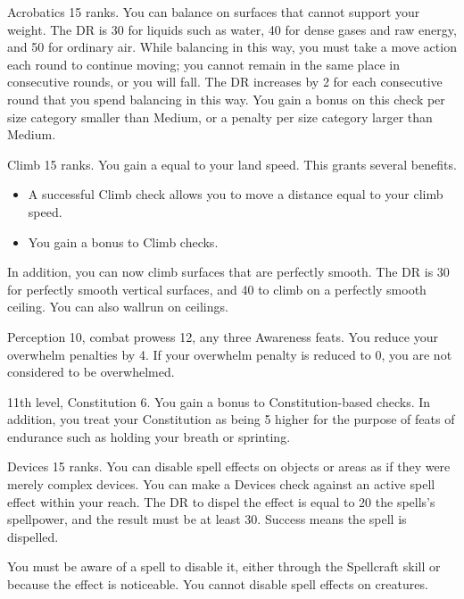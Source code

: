 \featpre Acrobatics 15 ranks.
\featben You can balance on surfaces that cannot support your weight.
The DR is 30 for liquids such as water, 40 for dense gases and raw energy, and 50 for ordinary air.
While balancing in this way, you must take a move action each round to continue moving; you cannot remain in the same place in consecutive rounds, or you will fall.
The DR increases by 2 for each consecutive round that you spend balancing in this way.
You gain a  bonus on this check per size category smaller than Medium, or a  penalty per size category larger than Medium.

\featpre Climb 15 ranks.
\featben You gain a  equal to your land speed.
This grants several benefits.
\begin{itemize}
    \item A successful Climb check allows you to move a distance equal to your climb speed.
    \item You gain a  bonus to Climb checks.
\end{itemize}

In addition, you can now climb surfaces that are perfectly smooth.
The DR is 30 for perfectly smooth vertical surfaces, and 40 to climb on a perfectly smooth ceiling.
You can also wallrun on ceilings.

\featpres Perception 10, combat prowess 12, any three Awareness feats.
\featben You reduce your overwhelm penalties by 4.
If your overwhelm penalty is reduced to 0, you are not considered to be overwhelmed.

\featpres 11th level, Constitution 6.
\featben You gain a  bonus to Constitution-based checks.
In addition, you treat your Constitution as being 5 higher for the purpose of feats of endurance such as holding your breath or sprinting.

\featpre Devices 15 ranks.
\featben You can disable spell effects on objects or areas as if they were merely complex devices.
You can make a Devices check against an active spell effect within your reach.
The DR to dispel the effect is equal to 20 \add the spells's spellpower, and the result must be at least 30.
Success means the spell is dispelled.

You must be aware of a spell to disable it, either through the Spellcraft skill or because the effect is noticeable.
You cannot disable spell effects on creatures.

